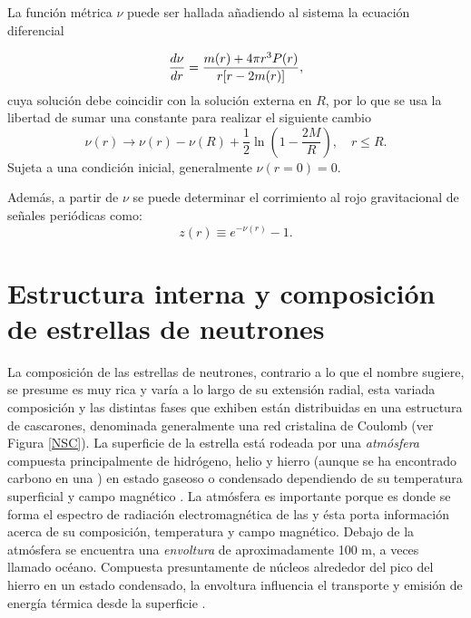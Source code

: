 La función métrica $\nu$ puede ser hallada añadiendo al sistema la ecuación diferencial

\begin{equation}
    \dv{\nu}{r} = \frac { m ( r ) + 4 \pi r ^ { 3 } P ( r ) } { r [ r - 2 m ( r ) ] },
\end{equation}
cuya solución debe coincidir con la solución externa en $R$, por lo que se usa la libertad de sumar una constante para realizar el siguiente cambio
\begin{equation}
    \nu ( r ) \longrightarrow \nu ( r ) - \nu ( R ) + \frac { 1 } { 2 } \ln \left( 1 - \frac { 2 M } { R } \right) , \quad r \leq R.
\end{equation}
Sujeta a una condición inicial, generalmente $\nu(r=0)=0$.

Además, a partir de $\nu$ se puede determinar el corrimiento al rojo gravitacional de señales periódicas \cite{Haensel2007NeutronStructure} como:
\begin{equation}
    z(r)\equiv e^{-\nu(r)}-1.
    \label{redshift}
\end{equation}



\section{Estructura interna y composición de estrellas de neutrones}

La composición de las estrellas de neutrones, contrario a lo que el nombre sugiere, se presume es muy rica y varía a lo largo de su extensión radial, esta variada composición y las distintas fases que exhiben están distribuidas en una estructura de cascarones, denominada generalmente una red cristalina de Coulomb (ver Figura \ref{NSC}).
La superficie de la estrella está rodeada por una \emph{atmósfera} compuesta principalmente de hidrógeno, helio y hierro (aunque se ha encontrado carbono en una \cite{Ho2009ARemnant}) en estado gaseoso o condensado dependiendo de su temperatura superficial y campo magnético \cite{Zavlin2002ModelingAtmospheres}. La atmósfera es importante porque es donde se forma el espectro de radiación electromagnética de las y ésta porta información acerca de su composición, temperatura y campo magnético.
Debajo de la atmósfera se encuentra una \emph{envoltura} de aproximadamente 100 \si{\metre}, a veces llamado océano. Compuesta presuntamente de núcleos alrededor del pico del hierro en un estado condensado, la envoltura influencia el transporte y emisión de energía térmica desde la superficie \cite{Piekarewicz2013,Potekhin,Lattimer2004}.




